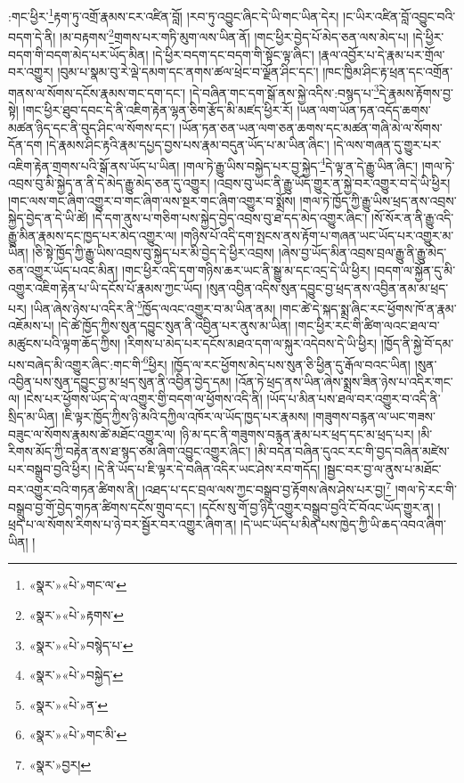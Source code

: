 :གང་ཕྱིར་\footnote{«སྣར་»«པེ་»གང་ལ་}རྟག་ཏུ་འགྲོ་རྣམས་ངར་འཛིན་བློ། །རབ་ཏུ་འབྱུང་ཞིང་དེ་ཡི་གང་ཡིན་དེར། །ང་ཡིར་འཛིན་བློ་འབྱུང་བའི་བདག་དེ་ནི། །མ་བརྟགས་\footnote{«སྣར་»«པེ་»རྟགས་}གྲགས་པར་གཏི་མུག་ལས་ཡིན་ནོ། །གང་ཕྱིར་བྱེད་པོ་མེད་ཅན་ལས་མེད་པ། །དེ་ཕྱིར་བདག་གི་བདག་མེད་པར་ཡོད་མིན། །དེ་ཕྱིར་བདག་དང་བདག་གི་སྟོང་ལྟ་ཞིང་། །རྣལ་འབྱོར་པ་དེ་རྣམ་པར་གྲོལ་བར་འགྱུར། །བུམ་པ་སྣམ་བུ་རེ་ལྡེ་དམག་དང་ནགས་ཚལ་ཕྲེང་བ་ལྗོན་ཤིང་དང་། །ཁང་ཁྱིམ་ཤིང་རྟ་ཕྲན་དང་འགྲོན་གནས་ལ་སོགས་དངོས་རྣམས་གང་དག་དང་། །དེ་བཞིན་གང་དག་སྒོ་ནས་སྐྱེ་འདིས་:བསྙད་པ་\footnote{«སྣར་»«པེ་»བསྙེད་པ་}དེ་རྣམས་རྟོགས་བྱ་སྟེ། །གང་ཕྱིར་ཐུབ་དབང་དེ་ནི་འཇིག་རྟེན་ལྷན་ཅིག་རྩོད་མི་མཛད་ཕྱིར་རོ། །ཡན་ལག་ཡོན་ཏན་འདོད་ཆགས་མཚན་ཉིད་དང་ནི་བུད་ཤིང་ལ་སོགས་དང་། །ཡོན་ཏན་ཅན་ཡན་ལག་ཅན་ཆགས་དང་མཚན་གཞི་མེ་ལ་སོགས་དོན་དག །དེ་རྣམས་ཤིང་རྟའི་རྣམ་དཔྱད་བྱས་པས་རྣམ་བདུན་ཡོད་པ་མ་ཡིན་ཞིང་། །དེ་ལས་གཞན་དུ་གྱུར་པར་འཇིག་རྟེན་གྲགས་པའི་སྒོ་ནས་ཡོད་པ་ཡིན། །གལ་ཏེ་རྒྱུ་ཡིས་བསྐྱེད་པར་བྱ་སྐྱེད་\footnote{«སྣར་»«པེ་»བསྐྱེད་}དེ་ལྟ་ན་དེ་རྒྱུ་ཡིན་ཞིང་། །གལ་ཏེ་འབྲས་བུ་མི་སྐྱེད་ན་ནི་དེ་མེད་རྒྱུ་མེད་ཅན་དུ་འགྱུར། །འབྲས་བུ་ཡང་ནི་རྒྱུ་ཡོད་གྱུར་ན་སྐྱེ་བར་འགྱུར་བ་དེ་ཡི་ཕྱིར། །གང་ལས་གང་ཞིག་འགྱུར་བ་གང་ཞིག་ལས་སྔར་གང་ཞིག་འགྱུར་བ་སྨྲོས། །གལ་ཏེ་ཁྱོད་ཀྱི་རྒྱུ་ཡིས་ཕྲད་ནས་འབྲས་སྐྱེད་བྱེད་ན་དེ་ཡི་ཚེ། །དེ་དག་ནུས་པ་གཅིག་པས་སྐྱེད་བྱེད་འབྲས་བུ་ཐ་དད་མེད་འགྱུར་ཞིང་། །སོ་སོར་ན་ནི་རྒྱུ་འདི་རྒྱུ་མིན་རྣམས་དང་ཁྱད་པར་མེད་འགྱུར་ལ། །གཉིས་པོ་འདི་དག་སྤངས་ནས་རྟོག་པ་གཞན་ཡང་ཡོད་པར་འགྱུར་མ་ཡིན། །ཅི་སྟེ་ཁྱོད་ཀྱི་རྒྱུ་ཡིས་འབྲས་བུ་སྐྱེད་པར་མི་བྱེད་དེ་ཕྱིར་འབྲས། །ཞེས་བྱ་ཡོད་མིན་འབྲས་བྲལ་རྒྱུ་ནི་རྒྱུ་མེད་ཅན་འགྱུར་ཡོད་པའང་མིན། །གང་ཕྱིར་འདི་དག་གཉིས་ཆར་ཡང་ནི་སྒྱུ་མ་དང་འདྲ་དེ་ཡི་ཕྱིར། །བདག་ལ་སྐྱོན་དུ་མི་འགྱུར་འཇིག་རྟེན་པ་ཡི་དངོས་པོ་རྣམས་ཀྱང་ཡོད། །སུན་འབྱིན་འདིས་སུན་དབྱུང་བྱ་ཕྲད་ནས་འབྱིན་ནམ་མ་ཕྲད་པར། །ཡིན་ཞེས་ཉེས་པ་འདིར་ནི་\footnote{«སྣར་»«པེ་»ན་}ཁྱོད་ལའང་འགྱུར་བ་མ་ཡིན་ནམ། །གང་ཚེ་དེ་སྐད་སྨྲ་ཞིང་རང་ཕྱོགས་ཁོ་ན་རྣམ་འཇོམས་པ། །དེ་ཚེ་ཁྱོད་ཀྱིས་སུན་དབྱུང་སུན་ནི་འབྱིན་པར་ནུས་མ་ཡིན། །གང་ཕྱིར་རང་གི་ཚིག་ལའང་ཐལ་བ་མཚུངས་པའི་ལྟག་ཆོད་ཀྱིས། །རིགས་པ་མེད་པར་དངོས་མཐའ་དག་ལ་སྐུར་འདེབས་དེ་ཡི་ཕྱིར། །ཁྱོད་ནི་སྐྱེ་བོ་དམ་པས་བཞེད་མི་འགྱུར་ཞིང་:གང་གི་\footnote{«སྣར་»«པེ་»གང་མི་}ཕྱིར། །ཁྱོད་ལ་རང་ཕྱོགས་མེད་པས་སུན་ཅི་ཕྱིན་དུ་རྒོལ་བའང་ཡིན། །སུན་འབྱིན་པས་སུན་དབྱུང་བྱ་མ་ཕྲད་སུན་ནི་འབྱིན་བྱེད་དམ། །འོན་ཏེ་ཕྲད་ནས་ཡིན་ཞེས་སྨྲས་ཟིན་ཉེས་པ་འདིར་གང་ལ། །ངེས་པར་ཕྱོགས་ཡོད་དེ་ལ་འགྱུར་གྱི་བདག་ལ་ཕྱོགས་འདི་ནི། །ཡོད་པ་མིན་པས་ཐལ་བར་འགྱུར་བ་འདི་ནི་སྲིད་མ་ཡིན། །ཇི་ལྟར་ཁྱོད་ཀྱིས་ཉི་མའི་དཀྱིལ་འཁོར་ལ་ཡོད་ཁྱད་པར་རྣམས། །གཟུགས་བརྙན་ལ་ཡང་གཟས་བཟུང་ལ་སོགས་རྣམས་ཚེ་མཐོང་འགྱུར་ལ། །ཉི་མ་དང་ནི་གཟུགས་བརྙན་རྣམ་པར་ཕྲད་དང་མ་ཕྲད་པར། །མི་རིགས་མོད་ཀྱི་བརྟེན་ནས་ཐ་སྙད་ཙམ་ཞིག་འབྱུང་འགྱུར་ཞིང་། །མི་བདེན་བཞིན་དུའང་རང་གི་བྱད་བཞིན་མཛེས་པར་བསྒྲུབ་བྱའི་ཕྱིར། །དེ་ནི་ཡོད་པ་ཇི་ལྟར་དེ་བཞིན་འདིར་ཡང་ཤེས་རབ་གདོད། །སྦྱང་བར་བྱ་ལ་ནུས་པ་མཐོང་བར་འགྱུར་བའི་གཏན་ཚིགས་ནི། །འཐད་པ་དང་བྲལ་ལས་ཀྱང་བསྒྲུབ་བྱ་རྟོགས་ཞེས་ཤེས་པར་བྱ།\footnote{«སྣར་»བྱར།} །གལ་ཏེ་རང་གི་བསྒྲུབ་བྱ་གོ་བྱེད་གཏན་ཚིགས་དངོས་གྲུབ་དང་། །དངོས་སུ་གོ་བྱ་ཉིད་འགྱུར་བསྒྲུབ་བྱའི་ངོ་བོའང་ཡོད་གྱུར་ན། །ཕྲད་པ་ལ་སོགས་རིགས་པ་ཉེ་བར་སྦྱོར་བར་འགྱུར་ཞིག་ན། །དེ་ཡང་ཡོད་པ་མིན་པས་ཁྱེད་ཀྱི་ཡི་ཆད་འབའ་ཞིག་ཡིན། །
